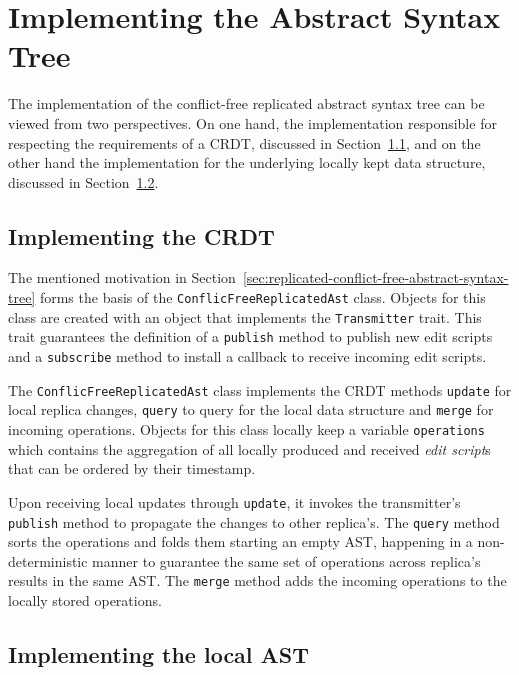 \section{Implementing the Abstract Syntax Tree}\label{sec:implementing-the-abstract-syntax-tree}

The implementation of the conflict-free replicated abstract syntax tree can be viewed from two perspectives.
On one hand, the implementation responsible for respecting the requirements of a CRDT, discussed in
Section~\ref{subsec:implementing-the-crdt}, and on the other hand the implementation for the underlying locally kept
data structure, discussed in Section~\ref{subsec:implementing-the-local-ast}.

\subsection{Implementing the CRDT}\label{subsec:implementing-the-crdt}

The mentioned motivation in Section~\ref{sec:replicated-conflict-free-abstract-syntax-tree} forms the basis of the
\texttt{ConflicFreeReplicatedAst} class.
Objects for this class are created with an object that implements the \texttt{Transmitter} trait.
This trait guarantees the definition of a \texttt{publish} method to publish new edit scripts and a
\texttt{subscribe} method to install a callback to receive incoming edit scripts.

The \texttt{ConflicFreeReplicatedAst} class implements the CRDT methods \texttt{update} for
local replica changes, \texttt{query} to query for the local data structure and \texttt{merge}
for incoming operations.
Objects for this class locally keep a variable \texttt{operations} which contains the aggregation of all
locally produced and received \emph{edit script}s that can be ordered by their timestamp.

Upon receiving local updates through \texttt{update}, it invokes the transmitter's
\texttt{publish} method to propagate the changes to other replica's.
The \texttt{query} method sorts the operations and folds them starting an empty AST,
happening in a non-deterministic manner to guarantee the same set of operations across replica's results in the same
AST.
The \texttt{merge} method adds the incoming operations to the locally stored operations.

\subsection{Implementing the local AST}\label{subsec:implementing-the-local-ast}

